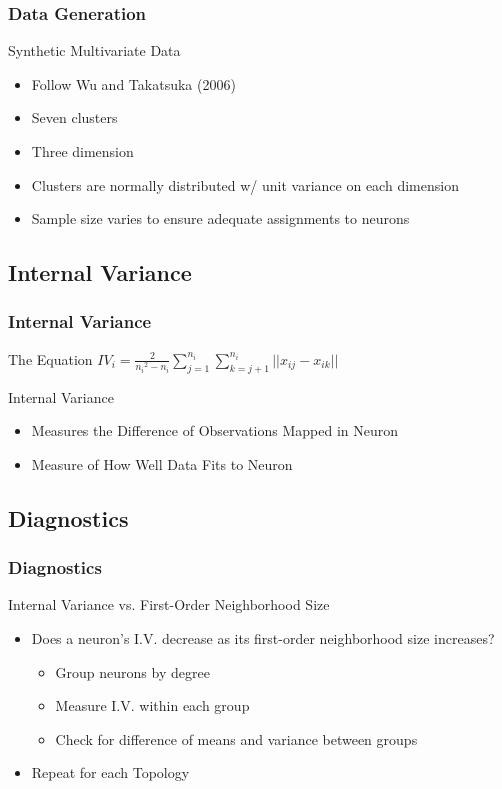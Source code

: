 \documentclass[nototal,handout]{beamer}
\begin{document}
\begin{frame}
	\frametitle{Data Generation}
 
\begin{block}{Synthetic Multivariate Data}
 \begin{itemize}
 \item  Follow Wu and Takatsuka (2006)
 \item  Seven clusters
 \item  Three dimension
 \item  Clusters are normally distributed w/ unit variance on each dimension
 \item  Sample size varies to ensure adequate assignments to neurons
 \end{itemize}
 \end{block} \end{frame} 

\subsection{Internal Variance} 

\begin{frame}
	\frametitle{Internal Variance}
 
\begin{block}{The Equation}
  \({IV_i} = \frac{2}{{n_i}^2-{n_i}}\sum_{j=1}^{n_i}\sum_{k=j+1}^{n_i} ||{x_{ij}}-{x_{ik}}||\)
 \end{block} 
\begin{block}{Internal Variance}
 \begin{itemize}
 \item  Measures the Difference of Observations Mapped in Neuron
 \item  Measure of How Well Data Fits to Neuron
 \end{itemize}
 \end{block} \end{frame} 

\subsection{Diagnostics} 

\begin{frame}
	\frametitle{Diagnostics}
 
\begin{block}{Internal Variance vs. First-Order Neighborhood Size}
 \begin{itemize}
 \item  Does a neuron's I.V. decrease as its first-order neighborhood size increases?
 \begin{itemize}
 \item  Group neurons by degree
 \item  Measure I.V. within each group
 \item  Check for difference of means and variance between groups
 \end{itemize}
 \item  Repeat for each Topology
 \end{itemize}
 \end{block} \end{frame} 
\end{document}
